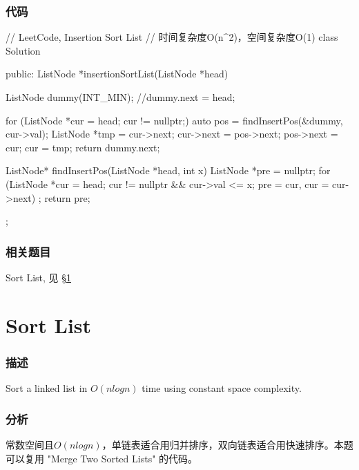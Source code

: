 \subsubsection{代码}
\begin{Code}
// LeetCode, Insertion Sort List
// 时间复杂度O(n^2)，空间复杂度O(1)
class Solution {
public:
    ListNode *insertionSortList(ListNode *head) {
        ListNode dummy(INT_MIN);
        //dummy.next = head;

        for (ListNode *cur = head; cur != nullptr;) {
            auto pos = findInsertPos(&dummy, cur->val);
            ListNode *tmp = cur->next;
            cur->next = pos->next;
            pos->next = cur;
            cur = tmp;
        }
        return dummy.next;
    }

    ListNode* findInsertPos(ListNode *head, int x) {
        ListNode *pre = nullptr;
        for (ListNode *cur = head; cur != nullptr && cur->val <= x;
            pre = cur, cur = cur->next)
            ;
        return pre;
    }
};
\end{Code}


\subsubsection{相关题目}
\begindot
\item Sort List, 见 \S \ref{sec:Sort-List}
\myenddot


\section{Sort List} %
\label{sec:Sort-List}


\subsubsection{描述}
Sort a linked list in $O(n log n)$ time using constant space complexity.


\subsubsection{分析}
常数空间且$O(nlogn)$，单链表适合用归并排序，双向链表适合用快速排序。本题可以复用 "Merge Two Sorted Lists" 的代码。


